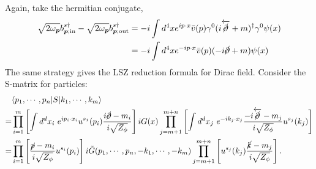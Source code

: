 Again, take the hermitian conjugate,
\begin{equation}
\begin{aligned}
	\sqrt{2\omega_{\bm p}}b^{s \dagger}_{\bm p;\mathrm{in}} - 
	\sqrt{2\omega_{\bm p}}b^{s \dagger}_{\bm p;\mathrm{out}} 
	&= -i\int d^4x e^{ip\cdot x}\bar v(p)\gamma^0(i\overleftarrow{\cancel\partial} + m)^\dagger \gamma^0 \psi(x) \\
	&= -i\int d^4x e^{-ip\cdot x}\bar v(p)(-i \cancel\partial + m) \psi(x)
\end{aligned}
\end{equation}
The same strategy gives the LSZ reduction formula for Dirac field.
Consider the S-matrix for particles:
\begin{equation}
\begin{aligned}
	& \langle p_1, \cdots, p_n| S |k_1, \cdots, k_m\rangle  \\
	=& \prod_{i=1}^{m}\left[ \int d^dx_i \ e^{ip_i\cdot x_i} u^{s_1}(p_i)\frac{i\cancel\partial-m_i}{i\sqrt{Z_\phi}}\right] iG(x)
	\prod_{j=m+1}^{m+n}\left[\int d^dx_j \ e^{-ik_j\cdot x_j}\frac{-i\overleftarrow{\cancel\partial}-m_j}{i\sqrt{Z_\phi}}u^{s_j}(k_j)\right] \\
	=& \prod_{i=1}^{m}\left[\frac{\cancel p-m_i}{i\sqrt{Z_\phi}}u^{s_i}(p_i)\right]
		i\tilde{G}(p_1,\cdots,p_n,-k_1,\cdots,-k_m)
		\prod_{j=m+1}^{m+n}\left[u^{s_j}(k_j)\frac{\cancel k-m_j}{i\sqrt{Z_\phi}}\right].
\end{aligned}
\end{equation}




